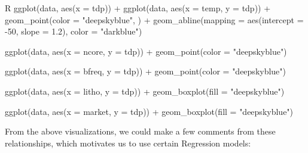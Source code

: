 \begin{code}{R}
ggplot(data, aes(x = tdp)) +
  ggplot(data, aes(x = temp, y = tdp)) +
  geom_point(color = "deepskyblue", ) +
  geom_abline(mapping = aes(intercept = -50, slope = 1.2), color = "darkblue")

ggplot(data, aes(x = ncore, y = tdp)) +
  geom_point(color = "deepskyblue")

ggplot(data, aes(x = bfreq, y = tdp)) +
  geom_point(color = "deepskyblue")

ggplot(data, aes(x = litho, y = tdp)) +
  geom_boxplot(fill = "deepskyblue")

ggplot(data, aes(x = market, y = tdp)) +
  geom_boxplot(fill = "deepskyblue")
\end{code}

From the above visualizations, we could make a few comments from these relationships, which motivates us to use certain Regression models:
